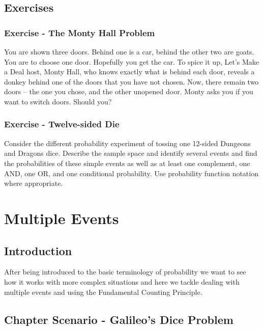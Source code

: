 \documentclass[]{book}
\theoremstyle{definition}
\theoremstyle{definition}
\theoremstyle{definition}
\theoremstyle{remark}
\begin{document}
\section{Exercises}\label{exercises}

\subsection{Exercise - The Monty Hall
Problem}\label{exercise---the-monty-hall-problem}

You are shown three doors. Behind one is a car, behind the other two are
goats. You are to choose one door. Hopefully you get the car. To spice
it up, Let's Make a Deal host, Monty Hall, who knows exactly what is
behind each door, reveals a donkey behind one of the doors that you have
not chosen. Now, there remain two doors -- the one you chose, and the
other unopened door. Monty asks you if you want to switch doors. Should
you?

\subsection{Exercise - Twelve-sided
Die}\label{exercise---twelve-sided-die}

Consider the different probability experiment of tossing one 12-sided
Dungeons and Dragons dice. Describe the sample space and identify
several events and find the probabilities of these simple events as well
as at least one complement, one AND, one OR, and one conditional
probability. Use probability function notation where appropriate.

\chapter{Multiple Events}\label{multiple_events}

\section{Introduction}\label{introduction_multiple_events}

After being introduced to the basic terminology of probability we want
to see how it works with more complex situations and here we tackle
dealing with multiple events and using the Fundamental Counting
Principle.

\section{Chapter Scenario - Galileo's Dice
Problem}\label{chapter_scenario_galileo_dice_problem}
\end{document}
